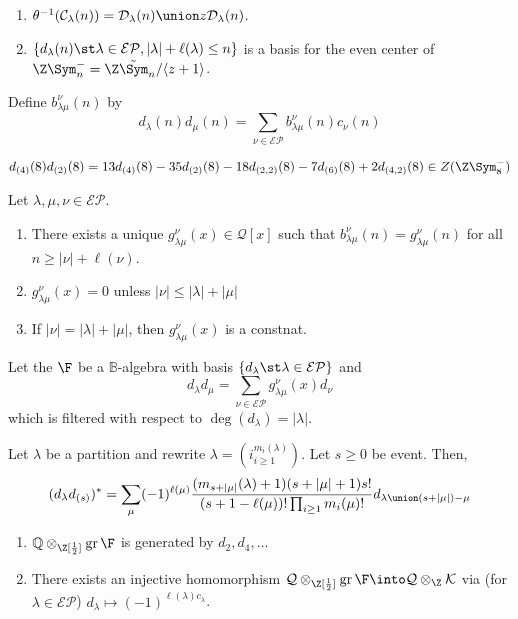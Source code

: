 \documentclass[11pt,leqno,oneside]{amsbook}
\renewcommand{\Q}{\mathcal{Q}}
\newcommand{\EP}{\mathcal{EP}} %
\newcommand{\CC}{\mathcal{C}} %
\newcommand{\B}{\mathbb{B}}
\newcommand{\K}{\mathcal{K}} %
\renewcommand{\D}{\mathcal{D}} %
\DeclareMathOperator{\gr}{gr}
\numberwithin{thm}{section}
\begin{document}
\begin{prop}
  \begin{enumerate}
  \item \(\theta^{-1}(\CC_\lambda(n)) = \D_\lambda(n) \union z
    \D_\lambda(n)\).
  \item \(\{d_\lambda(n) \st \lambda \in \EP, |\lambda|+\ell(\lambda)
    \leq n\}\) is a basis for the even center of \(\Z\Sym_n^- = \Z
    \tilde{\Sym}_n/\langle z+1 \rangle\). 
  \end{enumerate}
\end{prop}
\begin{defn}
  Define \(b_{\lambda \mu}^\nu(n)\) by \[
    d_{\lambda}(n) d_{\mu}(n) = \sum_{\nu \in \EP} b_{\lambda \mu}^\nu
    (n) c_\nu(n)
  \]
\end{defn}
\begin{example}
  \[
    d_{(4)}(8) d_{(2)}(8) = 13 d_{(4)}(8) - 35 d_{(2)}(8) - 18
    d_{(2,2)}(8) - 7d_{(6)}(8) + 2d_{(4,2)}(8) \in Z(\Z\Sym_8^-)
  \]
\end{example}
\begin{thm}
  Let \(\lambda,\mu,\nu \in \EP\).
  \begin{enumerate}
  \item There exists a unique \(g_{\lambda \mu}^\nu(x) \in \Q[x]\)
    such that \(b_{\lambda \mu}^\nu(n) = g_{\lambda \mu}^\nu(n)\) for
    all \(n \geq |\nu|+\ell(\nu)\).
  \item \(g_{\lambda \mu}^\nu(x) = 0\) unless \(|\nu| \leq
    |\lambda|+|\mu|\)
  \item If \(|\nu| = |\lambda|+|\mu|\), then \(g_{\lambda
      \mu}^\nu(x)\) is a constnat. 
  \end{enumerate}
\end{thm}
\begin{defn}
  Let the  \(\F\) be a \(\B\)-algebra with basis \(\{d_\lambda \st \lambda
  \in \EP\}\) and \[
    d_\lambda d_\mu = \sum_{\nu \in \EP} g_{\lambda \mu}^\nu(x) d_\nu
  \]
  which is filtered with respect to \(\deg(d_\lambda) = |\lambda|\).
\end{defn}
\begin{prop}
  Let \(\lambda\) be a partition and rewrite \(\lambda =
  (i^{m_i(\lambda)}_{i \geq 1})\). Let \(s \geq 0\) be event. Then, \[
    (d_\lambda d_{(s)})^* = \sum_\mu (-1)^{\ell(\mu)}
    \frac{(m_{s+|\mu|}(\lambda)+1)(s+|\mu|+1)s!}{(s+1-\ell(\mu))!
      \prod_{i \geq 1} m_i(\mu)!} d_{\lambda \union(s+|\mu|)-\mu}
  \]
\end{prop}
\begin{cor}
  \begin{enumerate}
  \item \(\mathbb{Q} \otimes_{\Z[\frac{1}{2}]} \gr \F\) is generated
    by \(d_2, d_4 ,\ldots\)
  \item There exists an injective homomorphism \(\Q
    \otimes_{\Z[\frac{1}{2}]} \gr \F \into \Q \otimes_\Z \K\) via (for
    \(\lambda \in \EP\)) 
    \(d_\lambda \mapsto (-1)^{\ell(\lambda)c_\lambda}\). 
  \end{enumerate}
\end{cor}
\end{document}
